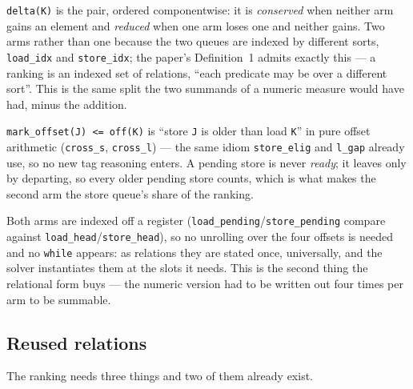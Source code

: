 \documentclass[11pt]{article}
\begin{document}
\texttt{delta(K)} is the pair, ordered componentwise: it is
\emph{conserved} when neither arm gains an element and \emph{reduced}
when one arm loses one and neither gains. Two arms rather than one
because the two queues are indexed by different sorts, \texttt{load_idx}
and \texttt{store_idx}; the paper's Definition~1 admits exactly this ---
a ranking is an indexed set of relations, ``each predicate may be over a
different sort''. This is the same split the two summands of a numeric
measure would have had, minus the addition.

\texttt{mark_offset(J) <= off(K)} is ``store \texttt{J} is older than load
\texttt{K}'' in pure offset arithmetic (\texttt{cross_s}, \texttt{cross_l})
--- the same idiom \texttt{store_elig} and
\texttt{l_gap} already use, so no new tag reasoning enters. A pending
store is never \emph{ready}; it leaves only by departing, so every older
pending store counts, which is what makes the second arm the store
queue's share of the ranking.

Both arms are indexed off a register (\texttt{load_pending}/\texttt{store_pending}
compare against \texttt{load_head}/\texttt{store_head}), so no unrolling
over the four offsets is needed and no \texttt{while} appears: as
relations they are stated once, universally, and the solver instantiates
them at the slots it needs. This is the second thing the relational form
buys --- the numeric version had to be written out four times per arm to
be summable.

\subsection{Reused relations}

The ranking needs three things and two of them already exist.
\end{document}
